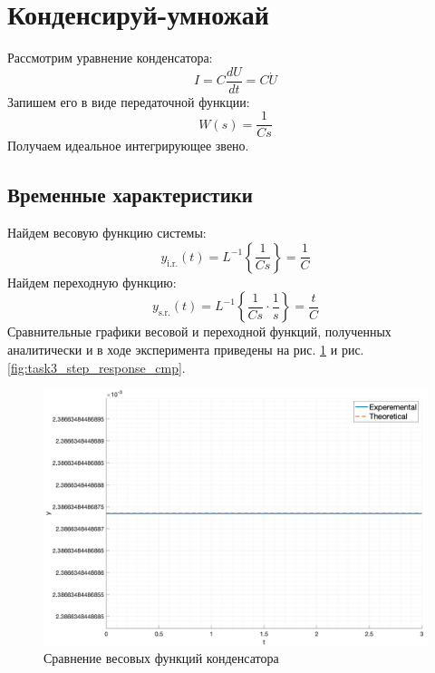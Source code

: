 \section{Конденсируй-умножай}
Рассмотрим уравнение конденсатора:
\begin{equation}
    I = C\frac{dU}{dt} = C\dot{U}
\end{equation}
Запишем его в виде передаточной функции:
\begin{equation}
    W(s) = \frac{1}{Cs}
\end{equation}
Получаем идеальное интегрирующее звено.
\subsection{Временные характеристики}
\noindent Найдем весовую функцию системы:
\begin{equation}
    y_{\text{i.r.}}(t) = L^{-1}\left\{\frac{1}{Cs}\right\} = \frac{1}{C} 
\end{equation}
Найдем переходную функцию:
\begin{equation}
    y_{\text{s.r.}}(t) = L^{-1}\left\{\frac{1}{Cs}\cdot\frac{1}{s}\right\} = \frac{t}{C} 
\end{equation}
Сравнительные графики весовой и переходной функций, полученных аналитически и в ходе эксперимента  приведены на рис. \ref{fig:task3_impulse_response_cmp} и рис. \ref{fig:task3_step_response_cmp}.
\begin{figure}[ht!]
    \centering
    \includegraphics[width=\textwidth]{media/plots/task3_impulse_response_cmp.png}
    \caption{Сравнение весовых функций конденсатора}
    \label{fig:task3_impulse_response_cmp}
\end{figure}
